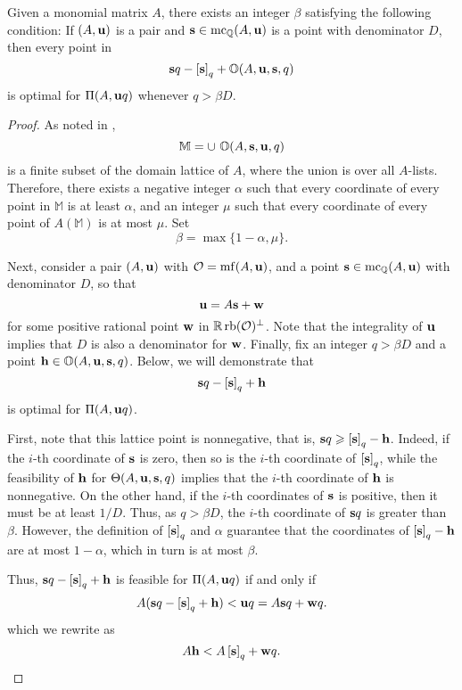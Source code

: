 \documentclass[11pt]{amsart}
\begin{document}

\begin{proposition}
\label{uniform value: P}
Given a monomial matrix $A$, there exists an integer $\beta$ satisfying the following condition\textup:  If $(A, \mathbf{u})$ is a pair and $\mathbf{s} \in \operatorname{mc}_{\mathbb{Q}}(A, \mathbf{u})$ is a point with denominator $D$, then every point in
\[ \mathbf{s}q - \left[ \mathbf{s} \right]_q + \mathbb{O}(A, \mathbf{u}, \mathbf{s}, q) \] is optimal for $\Pi(A, \mathbf{u}q)$ whenever $q >  \beta D$. 
\end{proposition}

\begin{proof} As noted in , 
%
\[ \mathbb{M} = \cup  \ \mathbb{O}( A, \mathbf{s}, \mathbf{u}, q )\]
%
is a finite subset of the domain lattice of $A$, where the union is over all $A$-lists.  Therefore, there exists a negative integer $\alpha$ such that every coordinate of every point in $\mathbb{M}$ is at least $\alpha$, and an integer $\mu$ such that every coordinate of every point of $A (\mathbb{M})$ is at most $\mu$.  Set \[ \beta =  \max \{ 1-\alpha, \mu \}.\]

Next, consider a pair $(A, \mathbf{u})$ with $\mathcal{O} = \operatorname{mf}(A, \mathbf{u})$, and a point $\mathbf{s} \in \operatorname{mc}_{\mathbb{Q}}(A, \mathbf{u})$ with denominator $D$, so that  \[ \mathbf{u} = A \mathbf{s} + \mathbf{w} \] for some positive rational point $\mathbf{w}$ in $\mathbb{R} \operatorname{rb}(\mathcal{O})^{\perp}$.  Note that the integrality of $\mathbf{u}$ implies that $D$ is also a denominator for $\mathbf{w}$.  Finally, fix an integer $q > \beta D$ and a point $\mathbf{h} \in \mathbb{O}(A, \mathbf{u}, \mathbf{s}, q)$.  Below, we will demonstrate that \[ \mathbf{s}q - \left[ \mathbf{s} \right]_q + \mathbf{h}\] is optimal for $\Pi(A, \mathbf{u}q)$.  

First, note that this lattice point is nonnegative, that is,   $\mathbf{s}q \geqslant \left[ \mathbf{s} \right]_q - \mathbf{h}$.  Indeed, if the $i$-th coordinate of $\mathbf{s}$ is zero, then so is the $i$-th coordinate of $\left[ \mathbf{s} \right]_q$, while the feasibility of  $\mathbf{h}$ for $\Theta(A, \mathbf{u}, \mathbf{s}, q)$ implies that the $i$-th coordinate of $\mathbf{h}$ is nonnegative.  On the other hand, if the $i$-th coordinates of $\mathbf{s}$ is positive, then it must be at least $1/D$.  Thus, as $q > \beta D$, the $i$-th coordinate of $\mathbf{s}q$ is greater than $\beta$.  However, the definition of $\left[ \mathbf{s} \right]_q$ and $\alpha$ guarantee that the coordinates of $\left[ \mathbf{s} \right]_q - \mathbf{h}$ are at most $1-\alpha$, which in turn is at most $\beta$.

Thus, $\mathbf{s}q - \left[ \mathbf{s} \right]_q + \mathbf{h}$ is feasible for $\Pi(A, \mathbf{u}q)$ if and only if
\[ A (\mathbf{s}q - \left[ \mathbf{s} \right]_q + \mathbf{h})  < \mathbf{u}q = A {\mathbf{s}}q + \mathbf{w}q.\] 
which we rewrite as 
\begin{equation} 
\label{equivalent ineq: e}
A \mathbf{h} < A \left[ \mathbf{s} \right]_q + \mathbf{w}q.
\end{equation}


\end{proof}
\end{document}
